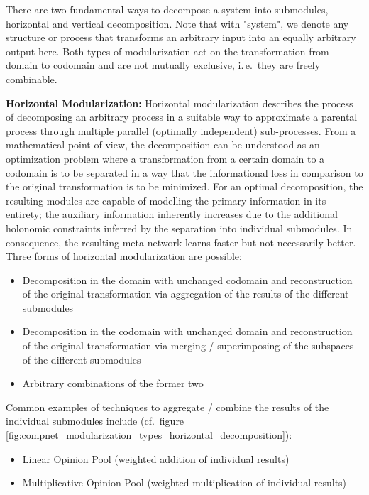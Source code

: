 There are two fundamental ways to decompose a system into submodules, horizontal and vertical decomposition. Note that with "system", we denote any structure or process that transforms an arbitrary input into an equally arbitrary output here. Both types of modularization act on the transformation from domain to codomain and are not mutually exclusive, i.\,e.\ they are freely combinable.

\textbf{Horizontal Modularization:} Horizontal modularization describes the process of decomposing an arbitrary process in a suitable way to approximate a parental process through multiple parallel (optimally independent) sub-processes. From a mathematical point of view, the decomposition can be understood as an optimization problem where a transformation from a certain domain to a codomain is to be separated in a way that the informational loss in comparison to the original transformation is to be minimized. For an optimal decomposition, the resulting modules are capable of modelling the primary information in its entirety; the auxiliary information inherently increases due to the additional holonomic constraints inferred by the separation into individual submodules. In consequence, the resulting meta-network learns faster but not necessarily better. Three forms of horizontal modularization are possible:

\begin{itemize}
    \item Decomposition in the domain with unchanged codomain and reconstruction of the original transformation via aggregation of the results of the different submodules
    \item Decomposition in the codomain with unchanged domain and reconstruction of the original transformation via merging / superimposing of the subspaces of the different submodules
    \item Arbitrary combinations of the former two
\end{itemize}

Common examples of techniques to aggregate / combine the results of the individual submodules include (cf.\ figure \ref{fig:compnet_modularization_types_horizontal_decomposition}):

\begin{itemize}
    \item Linear Opinion Pool (weighted addition of individual results)
    \item Multiplicative Opinion Pool (weighted multiplication of individual results)
\end{itemize}

